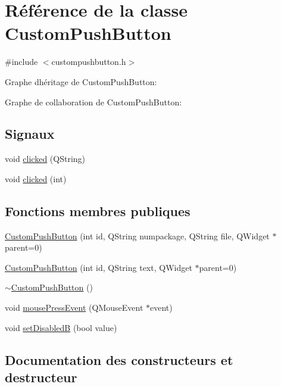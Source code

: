\hypertarget{class_custom_push_button}{}\section{Référence de la classe Custom\+Push\+Button}
\label{class_custom_push_button}


{\ttfamily \#include $<$custompushbutton.\+h$>$}



Graphe d\textquotesingle{}héritage de Custom\+Push\+Button\+:


Graphe de collaboration de Custom\+Push\+Button\+:
\subsection*{Signaux}
\begin{DoxyCompactItemize}
\item 
void \hyperlink{class_custom_push_button_aa34d2d9fad72242bcc7eb277b60e203d}{clicked} (Q\+String)
\item 
void \hyperlink{class_custom_push_button_a2ac09510a5edf6649c47aacdcf0d0234}{clicked} (int)
\end{DoxyCompactItemize}
\subsection*{Fonctions membres publiques}
\begin{DoxyCompactItemize}
\item 
\hyperlink{class_custom_push_button_a9e5f81f0cefdb410423880ee0bfc9b35}{Custom\+Push\+Button} (int id, Q\+String numpackage, Q\+String file, Q\+Widget $\ast$parent=0)
\item 
\hyperlink{class_custom_push_button_a3f75f492d08fd1f24201dc463bdd0421}{Custom\+Push\+Button} (int id, Q\+String text, Q\+Widget $\ast$parent=0)
\item 
\hyperlink{class_custom_push_button_a9cbae00fa38a49b31dc8828ba81527ae}{$\sim$\+Custom\+Push\+Button} ()
\item 
void \hyperlink{class_custom_push_button_adc95b9064c9d46e1b41b0f18a94c9baa}{mouse\+Press\+Event} (Q\+Mouse\+Event $\ast$event)
\item 
void \hyperlink{class_custom_push_button_a7721ef73e9afd78aefc90ba69aca05da}{set\+Disabled\+B} (bool value)
\end{DoxyCompactItemize}


\subsection{Documentation des constructeurs et destructeur}
\hypertarget{class_custom_push_button_a9e5f81f0cefdb410423880ee0bfc9b35}{}
